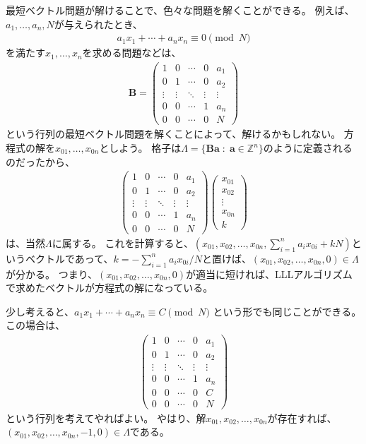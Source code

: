 最短ベクトル問題が解けることで、色々な問題を解くことができる。
例えば、$a_1,\ldots,a_n,N$が与えられたとき、
\begin{align*}
a_1x_1 + \cdots + a_nx_n \equiv 0 \pmod{N}
\end{align*}
を満たす$x_1,\ldots,x_n$を求める問題などは、
\begin{align*}
\mathbf{B}=
\begin{pmatrix}
1 & 0 & \cdots & 0 & a_1 \\
0 & 1 & \cdots & 0 & a_2 \\
\vdots & \vdots & \ddots & \vdots & \vdots \\
0 & 0 & \cdots & 1 & a_n \\
0 & 0 & \cdots & 0 & N
\end{pmatrix}
\end{align*}
という行列の最短ベクトル問題を解くことによって、解けるかもしれない。
方程式の解を$x_{01},\ldots,x_{0n}$としよう。
格子は$\Lambda = \{ \mathbf{Ba} \; : \; \mathbf{a} \in \mathbb{Z}^n\}$のように定義されるのだったから、
\begin{align*}
\begin{pmatrix}
1 & 0 & \cdots & 0 & a_1 \\
0 & 1 & \cdots & 0 & a_2 \\
\vdots & \vdots & \ddots & \vdots & \vdots \\
0 & 0 & \cdots & 1 & a_n \\
0 & 0 & \cdots & 0 & N
\end{pmatrix}
\begin{pmatrix}
x_{01}\\
x_{02}\\
\vdots\\
x_{0n}\\
k
\end{pmatrix}
\end{align*}
は、当然$\Lambda$に属する。
これを計算すると、$(x_{01},x_{02},\ldots,x_{0n},\sum_{i=1}^{n}a_ix_{0i} + kN)$というベクトルであって、$k=-\sum_{i=1}^{n}a_ix_{0i}/N$と置けば、$(x_{01},x_{02},\ldots,x_{0n},0)\in\Lambda$が分かる。
つまり、$(x_{01},x_{02},\ldots,x_{0n},0)$が適当に短ければ、LLLアルゴリズムで求めたベクトルが方程式の解になっている。

少し考えると、$a_1x_1 + \cdots + a_nx_n \equiv C \pmod{N}$
という形でも同じことができる。
この場合は、
\begin{align*}
\begin{pmatrix}
1 & 0 & \cdots & 0 & a_1 \\
0 & 1 & \cdots & 0 & a_2 \\
\vdots & \vdots & \ddots & \vdots & \vdots \\
0 & 0 & \cdots & 1 & a_n \\
0 & 0 & \cdots & 0 & C \\
0 & 0 & \cdots & 0 & N
\end{pmatrix}
\end{align*}
という行列を考えてやればよい。
やはり、解$x_{01},x_{02},\ldots,x_{0n}$が存在すれば、$(x_{01},x_{02},\ldots,x_{0n},-1,0)\in\Lambda$である。

